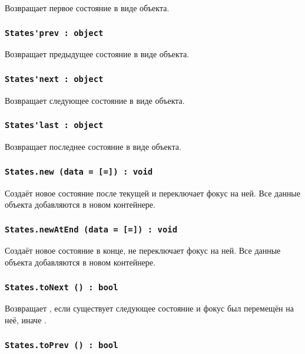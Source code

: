 Возвращает первое состояние в виде объекта.

\subsubsection{\lstinline|States'prev : object|}

Возвращает предыдущее состояние в виде объекта.

\subsubsection{\lstinline|States'next : object|}

Возвращает следующее состояние в виде объекта.

\subsubsection{\lstinline|States'last : object|}

Возвращает последнее состояние в виде объекта.

\subsubsection{\lstinline|States.new (data = [=]) : void|}

Создаёт новое состояние после текущей и переключает фокус на ней. Все данные объекта  добавляются в новом контейнере.

\subsubsection{\lstinline|States.newAtEnd (data = [=]) : void|}

Создаёт новое состояние в конце, не переключает фокус на ней. Все данные объекта  добавляются в новом контейнере.

\subsubsection{\lstinline|States.toNext () : bool|}

Возвращает \true, если существует следующее состояние и фокус был перемещён на неё, иначе \false.

\subsubsection{\lstinline|States.toPrev () : bool|}

